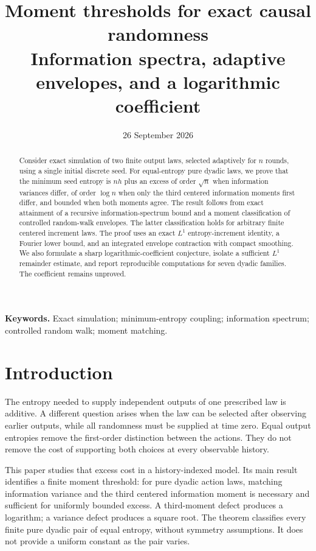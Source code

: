 \documentclass[11pt,a4paper]{article}
\title{\bfseries Moment thresholds for exact causal randomness\\[6pt]
\large Information spectra, adaptive envelopes, and a logarithmic coefficient}
\author{}
\date{26 September 2026}
\numberwithin{equation}{section}
\begin{document}
\maketitle
\begin{abstract}
Consider exact simulation of two finite output laws, selected adaptively
for $n$ rounds, using a single initial discrete seed. For equal-entropy
pure dyadic laws, we prove that the minimum seed entropy is $nh$ plus
an excess of order $\sqrt n$ when information variances differ, of order
$\log n$ when only the third centered information moments first differ,
and bounded when both moments agree. The result follows from exact
attainment of a recursive information-spectrum bound and a moment
classification of controlled random-walk envelopes. The latter
classification holds for arbitrary finite centered increment laws.
The proof uses an exact $L^1$ entropy-increment identity, a Fourier lower
bound, and an integrated envelope contraction with compact smoothing.
We also formulate a sharp logarithmic-coefficient conjecture, isolate a
sufficient $L^1$ remainder estimate, and report reproducible computations
for seven dyadic families. The coefficient remains unproved.
\end{abstract}
\noindent\textbf{Keywords.} Exact simulation; minimum-entropy coupling;
information spectrum; controlled random walk; moment matching.

\section{Introduction}
The entropy needed to supply independent outputs of one prescribed law
is additive. A different question arises when the law can be selected
after observing earlier outputs, while all randomness must be supplied
at time zero. Equal output entropies remove the first-order distinction
between the actions. They do not remove the cost of supporting both
choices at every observable history.

This paper studies that excess cost in a history-indexed model. Its main
result identifies a finite moment threshold: for pure dyadic action laws,
matching information variance and the third centered information moment
is necessary and sufficient for uniformly bounded excess. A third-moment
defect produces a logarithm; a variance defect produces a square root.
The theorem classifies every finite pure dyadic pair of equal entropy,
without symmetry assumptions. It does not provide a uniform constant as
the pair varies.
\end{document}
